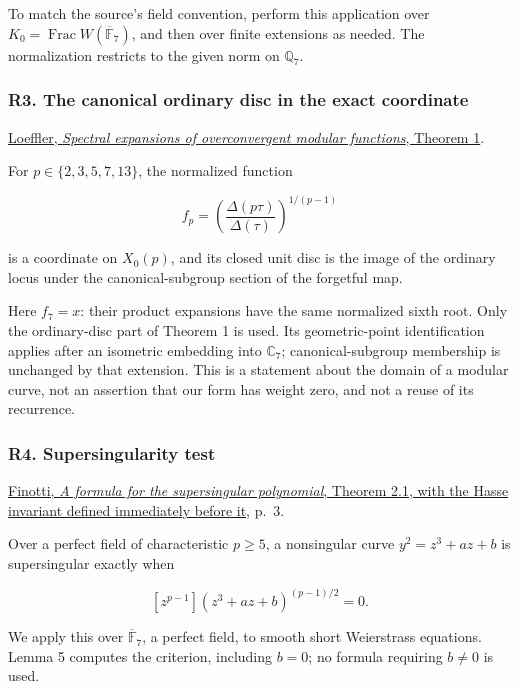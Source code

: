 \documentclass[11pt,a4paper]{article}
\begin{document}
To match the source's field convention, perform this application over \(K_0=\operatorname{Frac}W(\overline{\mathbb F}_7)\), and then over finite extensions as needed. The normalization restricts to the given norm on \(\mathbb Q_7\).

\hypertarget{r3.-the-canonical-ordinary-disc-in-the-exact-coordinate}{%
\subsubsection{R3. The canonical ordinary disc in the exact coordinate}\label{r3.-the-canonical-ordinary-disc-in-the-exact-coordinate}}

\href{https://arxiv.org/html/math/0701168v3\#S2}{Loeffler, \emph{Spectral expansions of overconvergent modular functions}, Theorem 1}.

For \(p\in\{2,3,5,7,13\}\), the normalized function

\[
f_p=\left(\frac{\Delta(p\tau)}{\Delta(\tau)}\right)^{1/(p-1)}
\]

is a coordinate on \(X_0(p)\), and its closed unit disc is the image of the ordinary locus under the canonical-subgroup section of the forgetful map.

Here \(f_7=x\): their product expansions have the same normalized sixth root. Only the ordinary-disc part of Theorem 1 is used. Its geometric-point identification applies after an isometric embedding into \(\mathbb C_7\); canonical-subgroup membership is unchanged by that extension. This is a statement about the domain of a modular curve, not an assertion that our form has weight zero, and not a reuse of its recurrence.

\hypertarget{r4.-supersingularity-test}{%
\subsubsection{R4. Supersingularity test}\label{r4.-supersingularity-test}}

\href{https://luisfinotti.org/math/papers/sspol.pdf}{Finotti, \emph{A formula for the supersingular polynomial}, Theorem 2.1, with the Hasse invariant defined immediately before it}, p.~3.

Over a perfect field of characteristic \(p\ge5\), a nonsingular curve \(y^2=z^3+az+b\) is supersingular exactly when

\[
[z^{p-1}](z^3+az+b)^{(p-1)/2}=0.
\tag{R3}
\]

We apply this over \(\overline{\mathbb F}_7\), a perfect field, to smooth short Weierstrass equations. Lemma 5 computes the criterion, including \(b=0\); no formula requiring \(b\ne0\) is used.
\end{document}
